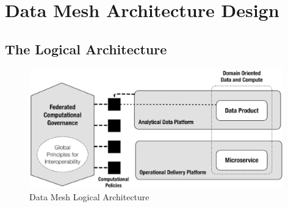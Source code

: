 \documentclass[12pt, a4paper]{book}
\begin{document}
\section{Data Mesh Architecture Design}
\subsection{The Logical Architecture}
\begin{figure}[ht]
	\begin{framed}
		\centering
		\includegraphics[width=11cm]{LogicalArchitecture.png}
		\caption{Data Mesh Logical Architecture \cite{machado2022data}}
		\label{LogicalArchitecture}
	\end{framed}
\end{figure}
\end{document}
